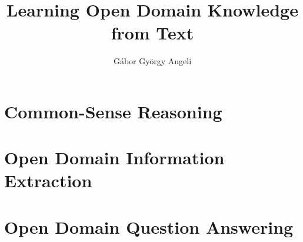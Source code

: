 \documentclass[12pt]{report}
\begin{document}
\title{Learning Open Domain Knowledge from Text}
\author{G\'{a}bor Gy\"{o}rgy Angeli}

\beforepreface


\afterpreface








\chapter{Common-Sense Reasoning}







\chapter{Open Domain Information Extraction}






\chapter{Open Domain Question Answering}









\appendix




\end{document}
